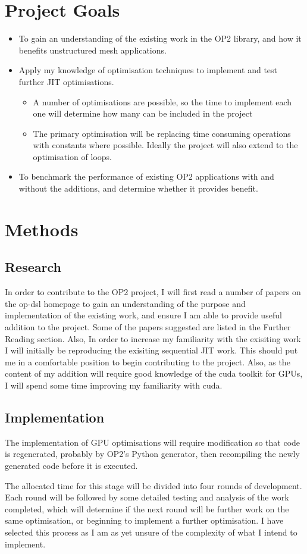 \documentclass[11pt]{article}
\begin{document}
\section*{Project Goals}
 \begin{itemize}
  \item{To gain an understanding of the existing work in the OP2 library, and how it benefits unstructured mesh applications.}
  \item{Apply my knowledge of optimisation techniques to implement and test further JIT optimisations.}\
\begin{itemize}
\item{A number of optimisations are possible, so the time to implement each one will determine how many can be included in the project}
\item{The primary optimisation will be replacing time consuming operations with constants where possible. Ideally the project will also extend to the optimisation of loops.}
\end{itemize}  
\item{To benchmark the performance of existing OP2 applications with and without the additions, and determine whether it provides benefit.}
 \end{itemize}

\section*{Methods}
\subsection*{Research}
In order to contribute to the OP2 project, I will first read a number of papers on the op-dsl homepage to gain an understanding of the purpose and implementation of the existing work, and ensure I am able to provide useful addition to the project. Some of the papers suggested are listed in the Further Reading section. Also, In order to increase my familiarity with the exisiting work I will initially be reproducing the exisiting sequential JIT work. This should put me in a comfortable position to begin contributing to the project.
Also, as the content of my addition will require good knowledge of the cuda toolkit for GPUs, I will spend some time improving my familiarity with cuda.
\subsection*{Implementation}
The implementation of GPU optimisations will require modification so that code is regenerated, probably by OP2's Python generator, then recompiling the newly generated code before it is executed.\par
The allocated time for this stage will be divided into four rounds of development. Each round will be followed by some detailed testing and analysis of the work completed, which will determine if the next round will be further work on the same optimisation, or beginning to implement a further optimisation. I have selected this process as I am as yet unsure of the complexity of what I intend to implement.
\end{document}

